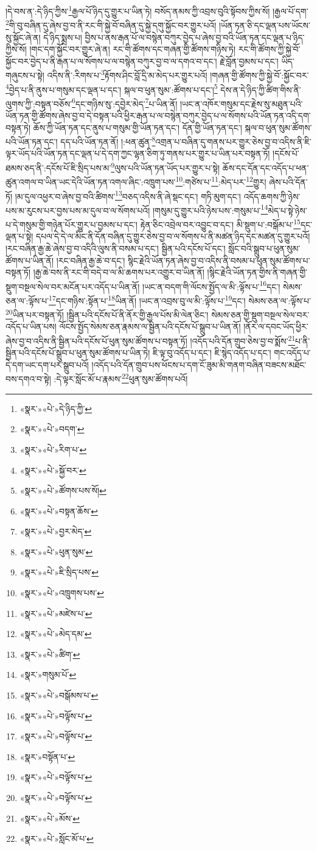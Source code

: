 །དེ་བས་ན་:དེ་ཉིད་ཀྱིས་\footnote{«སྣར་»«པེ་»དེ་ཉིད་ཀྱི་}རྒྱལ་པོ་ཉིད་དུ་གྱུར་པ་ཡིན་ཏེ། བསོད་ནམས་ཀྱི་འབྲས་བུའི་སྟོབས་ཀྱིས་སོ། །རྒྱལ་པོ་དག་\footnote{«སྣར་»«པེ་»བདག་}གི་བུ་བཞིན་དུ་ཞེས་བྱ་བ་ནི་རང་གི་སྐྱེ་བོ་བཞིན་དུ་སྐྱེ་དགུ་སྐྱོང་བར་གྱུར་པའོ། །ཡོན་ཏན་ཅི་དང་ལྡན་པས་ཡོངས་སུ་སྐྱོང་ཞེ་ན། དེ་ཉིད་སྨྲས་པ། བྱིས་པ་ནས་རྒན་པོ་ལ་བསྙེན་བཀུར་བྱེད་པ་ཞེས་བྱ་བའི་ཡོན་ཏན་དང་ལྡན་པ་ཉིད་ཀྱིས་སོ། །གང་དག་སྐྱོང་བར་གྱུར་ཞེ་ན། རང་གི་ཚོགས་དང་གཞན་གྱི་ཚོགས་གཉིས་ཏེ། རང་གི་ཚོགས་ཀྱི་སྐྱེ་བོ་སྐྱོང་བར་བྱེད་པ་ནི་རྒན་པ་ལ་སོགས་པ་ལ་བསྙེན་བཀུར་བྱ་བ་ལ་དགའ་བ་དང་། རྗེ་བློན་བྱམས་པ་དང་། ཡིད་གཞུངས་པ་སྟེ། འདིས་ནི་:རིགས་པ་\footnote{«སྣར་»«པེ་»རིག་པ་}རྟོགས་ཤིང་བློ་དྲི་མ་མེད་པར་གྱུར་པའོ། །གཞན་གྱི་ཚོགས་ཀྱི་སྐྱེ་བོ་:སྐྱོང་བར་\footnote{«སྣར་»«པེ་»སྐྱོ་བར་}བྱེད་པ་ནི་ནུས་པ་གསུམ་དང་ལྡན་པ་དང་། སྐལ་བ་ཕུན་སུམ་:ཚོགས་པ་དང་།\footnote{«སྣར་»«པེ་»ཚོགས་པས་སོ།} དེས་ན་དེ་ཉིད་ཀྱི་ཚིག་གིས་ནི་ལུགས་ཀྱི་:བསྟན་བཅོས་\footnote{«སྣར་»«པེ་»བསྟན་ཆོས་}དང་གཉིས་སུ་:དབྱེར་མེད་\footnote{«སྣར་»«པེ་»བྱར་མེད་}པ་ཡིན་ནོ། །ཡང་ན་འཁོར་གསུམ་དང་རྗེས་སུ་མཐུན་པའི་ཡོན་ཏན་གྱི་ཚོགས་ཞེས་བྱ་བ་དེ་བསྟན་པའི་ཕྱིར་རྒན་པ་ལ་བསྙེན་བཀུར་བྱེད་པ་ལ་སོགས་པའི་ཡོན་ཏན་འདི་དག་བསྟན་ཏེ། ཆོས་ཀྱི་ཡོན་ཏན་དང་ནུས་པ་གསུམ་གྱི་ཡོན་ཏན་དང་། དོན་གྱི་ཡོན་ཏན་དང་། སྐལ་བ་ཕུན་སུམ་ཚོགས་པའི་ཡོན་ཏན་དང་། དད་པའི་ཡོན་ཏན་ནོ། །:ཕན་ཚུན་\footnote{«སྣར་»«པེ་»ཕུན་སུམ་}འགྲན་པ་བཞིན་དུ་གནས་པར་གྱུར་ཅེས་བྱ་བ་འདིས་ནི་ཇི་ལྟར་ཡོད་པའི་ཡོན་ཏན་དང་ལྡན་པ་དེ་དག་ཀྱང་ལྷན་ཅིག་ཏུ་གནས་པར་གྱུར་པ་ཡིན་པར་བསྟན་ཏོ། །དངོས་པོ་ཐམས་ཅད་ནི་:དངོས་པོ་ཇི་སྲིད་པས་མ་\footnote{«སྣར་»«པེ་»ཇི་སྲིད་པས་}ལུས་པའི་ཡོན་ཏན་ཡོད་པར་གྱུར་པ་སྟེ། ཆོས་དང་དོན་དང་འདོད་པ་ཕན་ཚུན་འགལ་བ་ཡིན་ཡང་དེའི་ཡོན་ཏན་འགལ་ཞིང་:འཁྲུག་པས་\footnote{«སྣར་»«པེ་»འཁྲུགས་པས་}:གཙེས་པ་\footnote{«སྣར་»«པེ་»མཛེས་པ་}:མེད་པར་\footnote{«སྣར་»«པེ་»མེད་དམ་}གྱུར། ཞེས་པའི་དོན་ཏོ། །མ་དུལ་འཕྱར་བ་ཞེས་བྱ་བའི་ཚིགས་\footnote{«སྣར་»«པེ་»ཚིག་}བཅད་འདིས་ནི་ཞེ་སྡང་དང་། གཏི་མུག་དང་། འདོད་ཆགས་ཀྱི་ཉེས་པས་མ་རུངས་པར་བྱས་པས་མ་དུལ་བ་ལ་སོགས་པའོ། །གསུམ་དུ་གྱུར་པའི་ཉེས་པས་:གསུམ་པ་\footnote{«སྣར་»གསུམ་པོ་}མེད་པ་སྟེ་ཉེས་པ་དེ་གསུམ་གྱི་གཉེན་པོར་གྱུར་པ་བྱམས་པ་དང་། རྟེན་ཅིང་འབྲེལ་བར་འབྱུང་བ་དང་། མི་སྡུག་པ་:བསྒོམ་པ་\footnote{«སྣར་»«པེ་»བསྒོམས་པ་}དང་ལྡན་པ་སྟེ། དཔལ་དེ་དེ་ལ་མིང་ནི་དོན་བཞིན་དུ་གྱུར་ཅེས་བྱ་བ་ལ་སོགས་པ་ནི་མཚན་ཉིད་དང་མཚན་དུ་གྱུར་པའོ། །རང་བཞིན་རྒྱ་ཆེ་ཞེས་བྱ་བ་འདིའི་ལུས་ནི་བསམ་པ་དང་། སྦྱིན་པའི་དངོས་པོ་དང་། སློང་བའི་སྒྲུབ་པ་ཕུན་སུམ་ཚོགས་པ་ཡིན་ནོ། །རང་བཞིན་རྒྱ་ཆེ་བ་དང་། སྙིང་རྗེའི་ཡོན་ཏན་ཞེས་བྱ་བ་འདིས་ནི་བསམ་པ་ཕུན་སུམ་ཚོགས་པ་བསྟན་ཏོ། །རྒྱ་ཆེ་བས་ནི་རང་གི་བདེ་བ་ལ་མི་ཆགས་པར་འགྱུར་བ་ཡིན་ནོ། །སྙིང་རྗེའི་ཡོན་ཏན་གྱིས་ནི་གཞན་གྱི་སྡུག་བསྔལ་སེལ་བར་མངོན་པར་འདོད་པ་ཡིན་ནོ། །ཡང་ན་བདག་གི་ལོངས་སྤྱོད་ལ་མི་:ལྟོས་པ་\footnote{«སྣར་»«པེ་»བལྟོས་པ་}དང་། སེམས་ཅན་ལ་:ལྟོས་པ་\footnote{«སྣར་»«པེ་»བལྟོས་པ་}དང་གཉིས་:སྟོན་པ་\footnote{«སྣར་»བསྟོན་པ་}ཡིན་ནོ། །ཡང་ན་འབྲས་བུ་ལ་མི་:ལྟོས་པ་\footnote{«སྣར་»«པེ་»བལྟོས་པ་}དང་། སེམས་ཅན་ལ་:ལྟོས་པ་\footnote{«སྣར་»«པེ་»བལྟོས་པ་}ཡིན་པར་བསྟན་ཏོ། །སྦྱིན་པའི་དངོས་པོ་ནི་ནོར་གྱི་རྒྱལ་པོས་མི་ལེན་ཅིང་། སེམས་ཅན་གྱི་སྡུག་བསྔལ་སེལ་བར་འདོད་པ་ཡིན་པས། ལོངས་སྤྱོད་སེམས་ཅན་རྣམས་ལ་སྦྱིན་པའི་དངོས་པོ་སྒྲུབ་པ་ཡིན་ནོ། །ནོར་ལ་དབང་ཡོད་ཕྱིར་ཞེས་བྱ་བ་འདིས་ནི་སྦྱིན་པའི་དངོས་པོ་ཕུན་སུམ་ཚོགས་པ་བསྟན་ཏོ། །འདོད་པའི་དོན་གྲུབ་ཅེས་བྱ་བ་སྨོས་\footnote{«སྣར་»«པེ་»མོས་}པ་ནི་སྦྱིན་པའི་དངོས་པོ་སྒྲུབ་པ་ཕུན་སུམ་ཚོགས་པ་ཡིན་ཏེ། ཇི་ལྟ་བུ་འདོད་པ་དང་། ཇི་སྙེད་འདོད་པ་དང་། གང་འདོད་པ་དེ་དག་ཡང་དག་པར་སྒྲུབ་པའོ། །འདོད་པའི་དོན་གྲུབ་པས་ཕོངས་པ་དག་ངོ་ཟུམ་མི་གནག་བཞིན་བཟངས་མཐོང་བས་དགའ་བ་སྟེ། :དེ་ལྟར་སློང་མོ་པ་རྣམས་\footnote{«སྣར་»«པེ་»སློང་མོ་པ་}ཕུན་སུམ་ཚོགས་པའོ། 